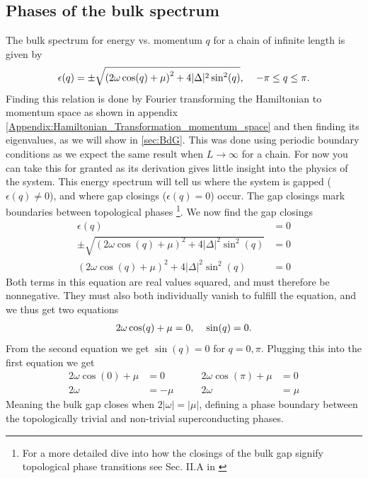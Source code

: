\subsection{Phases of the bulk spectrum}
The bulk spectrum for energy vs. momentum $q$ for a chain of infinite length is given by 
\begin{align}
    \epsilon(q) = \pm \sqrt{\left(2 \omega \cos(q) + \mu\right)^2 + 4 |\Delta|^2 \sin^2(q)}, \hspace{4mm} - \pi \leq q \leq \pi. \label{eq:Bulk_spectrum}
\end{align}
Finding this relation is done by Fourier transforming the Hamiltonian to momentum space as shown in appendix \ref{Appendix:Hamiltonian_Transformation_momentum_space} and then finding its eigenvalues, as we will show in \ref{sec:BdG}. This was done using periodic boundary conditions as we expect the same result when $L \to \infty$ for a chain. For now you can take this for granted as its derivation gives little insight into the physics of the system. This energy spectrum will tell us where the system is gapped ($\epsilon(q) \neq 0$), and where gap closings ($\epsilon(q) = 0$) occur. The gap closings mark boundaries between topological phases \footnote{For a more detailed dive into how the closings of the bulk gap signify topological phase transitions see Sec. II.A in \cite{aliceaNewDirectionsPursuit2012}}. We now find the gap closings 
\begin{align}
    \epsilon(q) &= 0\\
    \pm \sqrt{\left(2 \omega \cos(q) + \mu\right)^2 + 4 |\Delta|^2 \sin^2(q)} &= 0 \\
    \left(2 \omega \cos(q) + \mu\right)^2 + 4 |\Delta|^2 \sin^2(q) &= 0
\end{align}
Both terms in this equation are real values squared, and must therefore be nonnegative. They must also both individually vanish to fulfill the equation, and we thus get two equations
\begin{align}
    2 \omega \cos(q) + \mu = 0, \hspace{4mm} \sin(q) = 0.
\end{align}
From the second equation we get $\sin(q) = 0$ for $q = 0, \pi$. Plugging this into the first equation we get
\begin{equation}
  \begin{aligned}
    2 \omega \cos(0) + \mu &= 0\\
    2 \omega &= -\mu 
  \end{aligned}
  \qquad
  \begin{aligned}
    2 \omega \cos(\pi) + \mu &= 0 \\
      2 \omega &= \mu
  \end{aligned}
\end{equation}
Meaning the bulk gap closes when $2|\omega| = |\mu|$, defining a phase boundary between the topologically trivial and non-trivial superconducting phases. 


